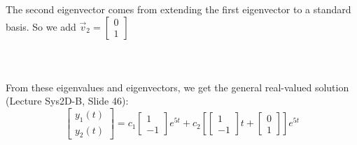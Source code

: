 \documentclass[12pt]{article}
\begin{document}
\\ \\
The second eigenvector comes from extending the first eigenvector to a standard basis.  So we add $\vec{v}_{2} = \begin{bmatrix} 0 \\ 1 \end{bmatrix}$
\\ \\ \\ \\
From these eigenvalues and eigenvectors, we get the general real-valued solution (Lecture Sys2D-B, Slide 46):
$$
\begin{bmatrix} y_1(t) \\ y_2(t) \end{bmatrix} =
c_1 \begin{bmatrix}	1 \\ -1	\end{bmatrix} e^{5t} +
c_2  \left[ \begin{bmatrix}	1 \\ -1	\end{bmatrix}t + \begin{bmatrix} 0 \\ 1 \end{bmatrix} \right]e^{5t}
$$

\newpage 
\end{document}
